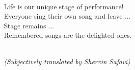 \pagestyle{empty}

\hfill

\vfill

\\[5pt]
Life is our unique stage of performance!\\
Everyone sing their own song and leave ...\\
Stage remains ... \\
Remembered songs are the delighted ones.\\[5pt]
\begin{flushright}
  \\
  \noindent \footnotesize{\textit{(\footnotesize{Subjectively translated by Shervin Safavi})}}
\end{flushright}


\vfill


